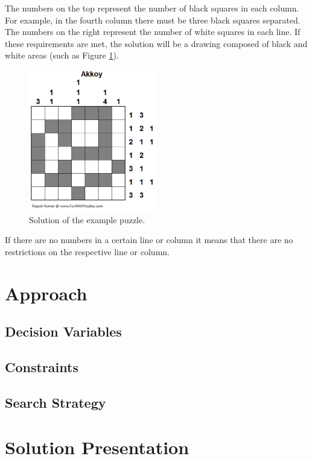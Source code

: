 \documentclass[runningheads,a4paper]{llncs}
\begin{document}
The numbers on the top represent the number of black squares in each column. For example, in the fourth column there must be three black squares separated. The numbers on the right represent the number of white squares in each line. If these requirements are met, the solution will be a drawing composed of black and white areas (such as Figure \ref{solution}). 

\begin{figure}[h!]
\centering
\includegraphics[height=6.2cm]{solucaoExemplo.png}
\caption{Solution of the example puzzle.}
\label{solution}
\end{figure}

If there are no numbers in a certain line or column it means that there are no restrictions on the respective line or column.

\section {Approach}



\subsection{Decision Variables}

\subsection{Constraints}

\subsection{Search Strategy}



\section{Solution Presentation}
\end{document}
